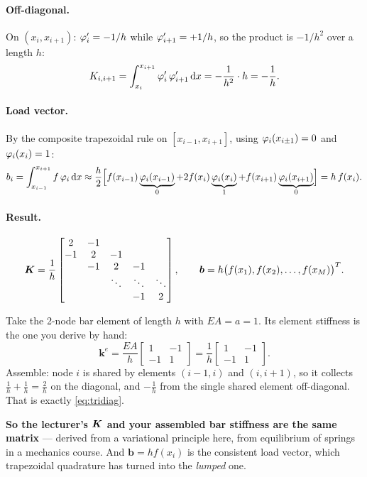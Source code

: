 \paragraph{Off-diagonal.} On $(x_{i},x_{i+1})$: $\varphi_{i}'=-1/h$ while
$\varphi_{i+1}'=+1/h$, so the product is $-1/h^{2}$ over a length $h$:
\begin{equation}
  K_{i,i+1}=\int_{x_{i}}^{x_{i+1}}\varphi_{i}'\,\varphi_{i+1}'\,\mathrm{d} x
  = -\frac{1}{h^{2}}\cdot h = -\frac{1}{h}.
\end{equation}

\paragraph{Load vector.} By the composite trapezoidal rule on
$[x_{i-1},x_{i+1}]$, using $\varphi_{i}(x_{i\pm1})=0$ and $\varphi_{i}(x_{i})=1$:
\begin{equation}
  b_{i}=\int_{x_{i-1}}^{x_{i+1}} f\,\varphi_{i}\,\mathrm{d} x
  \approx \frac{h}{2}\Bigl[f(x_{i-1})\underbrace{\varphi_{i}(x_{i-1})}_{0}
  + 2f(x_{i})\underbrace{\varphi_{i}(x_{i})}_{1}
  + f(x_{i+1})\underbrace{\varphi_{i}(x_{i+1})}_{0}\Bigr]
  = h\,f(x_{i}).
\end{equation}

\paragraph{Result.}
\begin{equation}\label{eq:tridiag}
  \bm{K}=\frac{1}{h}
  \begin{bmatrix}
     2 & -1 &    &    &   \\
    -1 &  2 & -1 &    &   \\
       & -1 &  2 & -1 &   \\
       &    & \ddots & \ddots & \ddots\\
       &    &    & -1 &  2
  \end{bmatrix},
  \qquad
  \bm{b}=h\bigl(f(x_{1}),f(x_{2}),\dots,f(x_{M})\bigr)^{T}.
\end{equation}

\begin{mechanics}
Take the 2-node bar element of length $h$ with $EA=a=1$. Its element stiffness
is the one you derive by hand:
\[
  \bm{k}^{e}=\frac{EA}{h}\begin{bmatrix}1&-1\\-1&1\end{bmatrix}
  =\frac{1}{h}\begin{bmatrix}1&-1\\-1&1\end{bmatrix}.
\]
Assemble: node $i$ is shared by elements $(i{-}1,i)$ and $(i,i{+}1)$, so it
collects $\tfrac1h+\tfrac1h=\tfrac2h$ on the diagonal, and $-\tfrac1h$ from the
single shared element off-diagonal. That is exactly \eqref{eq:tridiag}.

\textbf{So the lecturer's $\bm{K}$ and your assembled bar stiffness are the same
matrix} --- derived from a variational principle here, from equilibrium of
springs in a mechanics course. And $\bm{b}=h f(x_{i})$ is the consistent load
vector, which trapezoidal quadrature has turned into the \emph{lumped} one.
\end{mechanics}

